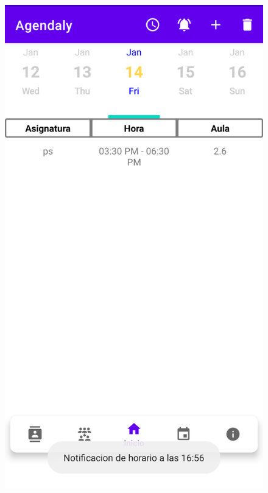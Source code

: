 \documentclass[a4paper,openright,12pt]{article}
\begin{document}
\begin{figure}
        \includegraphics[scale=0.05]{notificacion4.png}\hfill 

\end{figure}
\end{document}
